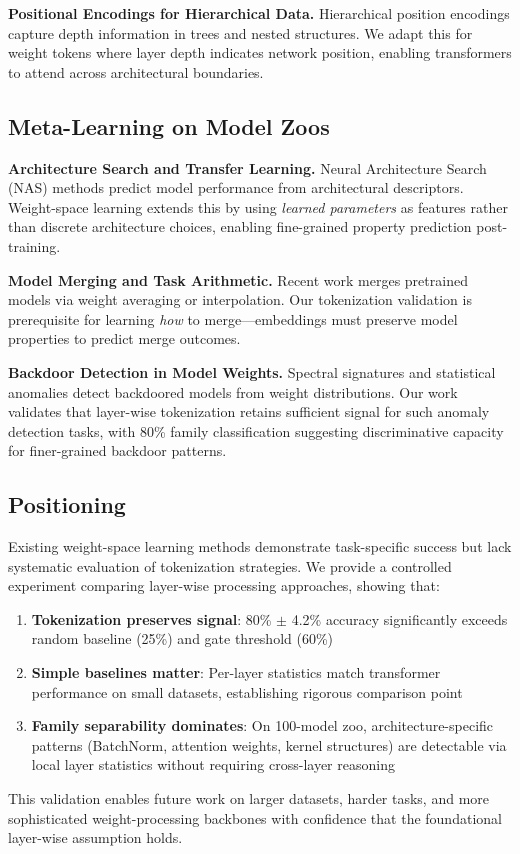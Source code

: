 \textbf{Positional Encodings for Hierarchical Data.} Hierarchical position encodings \cite{shaw2018self} capture depth information in trees and nested structures. We adapt this for weight tokens where layer depth indicates network position, enabling transformers to attend across architectural boundaries.

\subsection{Meta-Learning on Model Zoos}

\textbf{Architecture Search and Transfer Learning.} Neural Architecture Search (NAS) methods \cite{zoph2017neural} predict model performance from architectural descriptors. Weight-space learning extends this by using \textit{learned parameters} as features rather than discrete architecture choices, enabling fine-grained property prediction post-training.

\textbf{Model Merging and Task Arithmetic.} Recent work \cite{wortsman2022model,ilharco2023editing} merges pretrained models via weight averaging or interpolation. Our tokenization validation is prerequisite for learning \textit{how} to merge—embeddings must preserve model properties to predict merge outcomes.

\textbf{Backdoor Detection in Model Weights.} Spectral signatures \cite{wang2019neural} and statistical anomalies \cite{tran2018spectral} detect backdoored models from weight distributions. Our work validates that layer-wise tokenization retains sufficient signal for such anomaly detection tasks, with 80\% family classification suggesting discriminative capacity for finer-grained backdoor patterns.

\subsection{Positioning}

Existing weight-space learning methods demonstrate task-specific success but lack systematic evaluation of tokenization strategies. We provide a controlled experiment comparing layer-wise processing approaches, showing that:

\begin{enumerate}
\item \textbf{Tokenization preserves signal}: 80\% $\pm$ 4.2\% accuracy significantly exceeds random baseline (25\%) and gate threshold (60\%)
\item \textbf{Simple baselines matter}: Per-layer statistics match transformer performance on small datasets, establishing rigorous comparison point
\item \textbf{Family separability dominates}: On 100-model zoo, architecture-specific patterns (BatchNorm, attention weights, kernel structures) are detectable via local layer statistics without requiring cross-layer reasoning
\end{enumerate}

This validation enables future work on larger datasets, harder tasks, and more sophisticated weight-processing backbones with confidence that the foundational layer-wise assumption holds.
